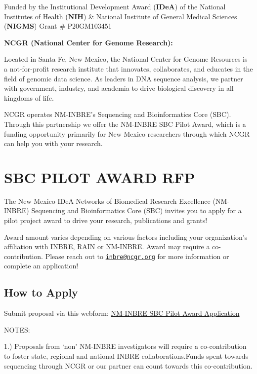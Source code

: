 \documentclass[
]{book}
\begin{document}
Funded by the Institutional Development Award (\textbf{IDeA}) of the National Institutes of Health (\textbf{NIH}) \& National Institute of General Medical Sciences (\textbf{NIGMS}) Grant \# P20GM103451

\textbf{NCGR (National Center for Genome Research):}

Located in Santa Fe, New Mexico, the National Center for Genome Resources is a not-for-profit research institute that innovates, collaborates, and educates in the field of genomic data science. As leaders in DNA sequence analysis, we partner with government, industry, and academia to drive biological discovery in all kingdoms of life.

NCGR operates NM-INBRE's Sequencing and Bioinformatics Core (SBC). Through this partnership we offer the NM-INBRE SBC Pilot Award, which is a funding opportunity primarily for New Mexico researchers through which NCGR can help you with your research.

\hypertarget{sbc-pilot-award-rfp}{%
\chapter*{SBC PILOT AWARD RFP}\label{sbc-pilot-award-rfp}}

The New Mexico IDeA Networks of Biomedical Research Excellence (NM-INBRE) Sequencing and Bioinformatics Core (SBC) invites you to apply for a pilot project award to drive your research, publications and grants!

Award amount varies depending on various factors including your organization's affiliation with INBRE, RAIN or NM-INBRE. Award may require a co-contribution. Please reach out to \href{mailto:inbre@ncgr.org}{\nolinkurl{inbre@ncgr.org}} for more information or complete an application!

\hypertarget{how-to-apply}{%
\section*{How to Apply}\label{how-to-apply}}

Submit proposal via this webform: \href{https://docs.google.com/forms/d/e/1FAIpQLScpoBLtsMdId8wDGZ2IqXRg-3C54JQQWNy3skT7UTShUH4JZw/viewform}{NM-INBRE SBC Pilot Award Application}

NOTES:

1.) Proposals from `non' NM-INBRE investigators will require a co-contribution to foster state, regional and national INBRE collaborations.Funds spent towards sequencing through NCGR or our partner can count towards this co-contribution.
\end{document}
